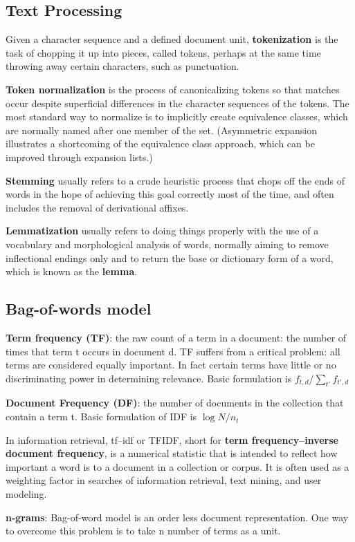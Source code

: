 \documentclass[12pt]{article}
\begin{document}
\subsection{Text Processing}
\ulb
\item Given a character sequence and a defined document unit, \textbf{tokenization} is the task of chopping it up into pieces, called tokens, perhaps at the same time throwing away certain characters, such as punctuation.
\item \textbf{Token normalization} is the process of canonicalizing tokens so that matches occur despite superficial differences in the character sequences of the tokens. The most standard way to normalize is to implicitly create equivalence classes, which are normally named after one member of the set. (Asymmetric expansion illustrates a shortcoming of the equivalence class approach, which can be improved through expansion lists.)
\item \textbf{Stemming} usually refers to a crude heuristic process that chops off the ends of words in the hope of achieving this goal correctly most of the time, and often includes the removal of derivational affixes.
\item \textbf{Lemmatization} usually refers to doing things properly with the use of a vocabulary and morphological analysis of words, normally aiming to remove inflectional endings only and to return the base or dictionary form of a word, which is known as the \textbf{lemma}.
\ule

\subsection{Bag-of-words model}
\par \textbf{Term frequency (TF)}: the raw count of a term in a document: the number of times that term t occurs in document d. TF suffers from a critical problem: all terms are considered equally important. In fact certain terms have little or no discriminating power in determining relevance. Basic formulation is $f_{t,d} / \sum_{t'} f_{t',d}$
\par \textbf{Document Frequency (DF)}: the number of documents in the collection that contain a term t. Basic formulation of IDF is $\log N / n_t$
\par In information retrieval, tf–idf or TFIDF, short for \textbf{term frequency–inverse document frequency}, is a numerical statistic that is intended to reflect how important a word is to a document in a collection or corpus. It is often used as a weighting factor in searches of information retrieval, text mining, and user modeling.
\par \textbf{n-grams}: Bag-of-word model is an order less document representation. One way to overcome this problem is to take n number of terms as a unit.
\end{document}
